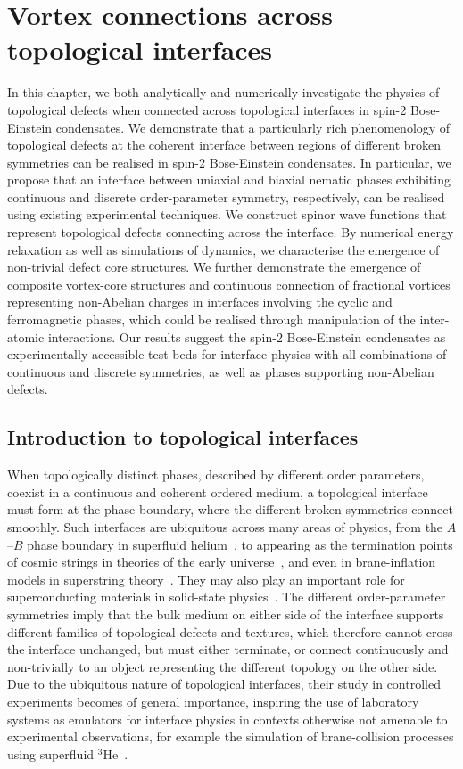 \chapter{Vortex connections across topological interfaces}\label{chap: spin-2}
In this chapter, we both analytically and numerically investigate the physics
of topological defects when connected across topological interfaces in spin-2
Bose-Einstein condensates.
We demonstrate that a particularly rich phenomenology of topological defects
at the coherent
interface between regions of different broken symmetries can be realised in
spin-2 Bose-Einstein condensates.
In particular, we propose that an interface between uniaxial and biaxial nematic
phases exhibiting continuous and discrete order-parameter symmetry,
respectively, can be realised using existing experimental techniques.
We construct spinor wave functions that represent topological defects connecting
across the interface.
By numerical energy relaxation as well as simulations of dynamics, we
characterise the emergence of non-trivial defect core structures.
We further demonstrate the emergence of composite vortex-core structures and
continuous connection of fractional vortices representing non-Abelian charges in
interfaces involving the cyclic and ferromagnetic phases, which could be
realised through manipulation of the inter-atomic interactions.
Our results suggest the spin-2 Bose-Einstein condensates as experimentally
accessible test beds for interface physics with all combinations of continuous
and discrete symmetries, as well as phases supporting non-Abelian defects.

\section{Introduction to topological interfaces}
When topologically distinct phases, described by different order parameters,
coexist in a continuous and coherent ordered medium, a topological interface
must form at the phase boundary, where the different broken symmetries connect
smoothly.
Such interfaces are ubiquitous across many areas of physics, from the
\(A\)--\(B\) phase boundary in superfluid
helium~\cite{Salomaa1987, Volovik2009, Finne2006}, to appearing as the
termination points of cosmic strings in theories of the early
universe~\cite{Kibble1976, Vilenkin1994}, and even in brane-inflation
models in superstring theory~\cite{Dvali1999, Sarangi2002}.
They may also play an important role for superconducting materials in
solid-state physics~\cite{Bert2011}.
The different order-parameter symmetries imply that the bulk medium on either
side of the interface supports different families of topological defects and
textures, which therefore cannot cross the interface unchanged, but must either
terminate, or connect continuously and non-trivially to an object representing
the different topology on the other side.
Due to the ubiquitous nature of topological interfaces, their study in
controlled experiments becomes of general importance, inspiring the use of
laboratory systems as emulators for interface physics in contexts otherwise not
amenable to experimental observations, for example the simulation of
brane-collision processes using superfluid \(^3\)He~\cite{Bradley2007}.

